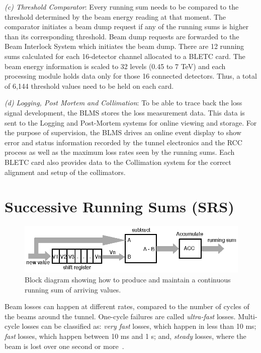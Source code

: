 \documentclass{llncs}
\begin{document}
\emph{(c) Threshold Comparator}: Every running sum needs to be compared to the threshold determined by the beam energy reading at that moment.
The comparator initiates a beam dump request if any of the running sums is higher than its corresponding threshold.
Beam dump requests are forwarded to the Beam Interlock System which initiates the beam dump.
There are 12 running sums calculated for each 16-detector channel allocated to a BLETC card.
The beam energy information is scaled to 32 levels (0.45 to 7 TeV) and each processing module holds data only for those 16 connected detectors.
Thus, a total of 6,144 threshold values need to be held on each card.

\emph{(d) Logging, Post Mortem and Collimation}:  To be able to trace back the loss signal development, the BLMS stores the loss measurement data.
This data is sent to the Logging and Post-Mortem systems for online viewing and storage.
For the purpose of supervision, the BLMS drives an online event display to show error and status information recorded by the tunnel electronics and the RCC process as well as the maximum loss rates seen by the running sums.
Each BLETC card also provides data to the Collimation system for the correct alignment and setup of the collimators.

\section{Successive Running Sums (SRS)}
\label{sec-SRS}

\begin{figure}[t]
  \centering \includegraphics{rs.eps}
   \caption{Block diagram showing how to produce and maintain a continuous running sum of arriving values.}
  \label{fig:RS-basic}
\end{figure}

Beam losses can happen at different rates, compared to the number of cycles of the beams around the tunnel.
One-cycle failures are called \emph{ultra-fast} losses.
Multi-cycle losses can be classified as: \emph{very fast} losses, which happen in less than 10 ms; \emph{fast} losses, which happen between 10 ms and 1 s; and, \emph{steady} losses, where the beam is lost over one second or more~\cite{Schmidt-ICFA}.
\end{document}
